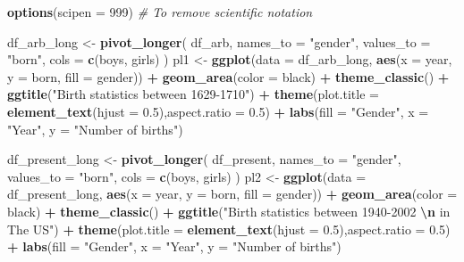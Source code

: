 \documentclass[11pt,a4paper,]{article}
\newenvironment{Shaded}{\begin{snugshade}}{\end{snugshade}}
\newcommand{\AttributeTok}[1]{\textcolor[rgb]{0.13,0.29,0.53}{#1}}
\newcommand{\CommentTok}[1]{\textcolor[rgb]{0.56,0.35,0.01}{\textit{#1}}}
\newcommand{\DecValTok}[1]{\textcolor[rgb]{0.00,0.00,0.81}{#1}}
\newcommand{\FloatTok}[1]{\textcolor[rgb]{0.00,0.00,0.81}{#1}}
\newcommand{\FunctionTok}[1]{\textcolor[rgb]{0.13,0.29,0.53}{\textbf{#1}}}
\newcommand{\NormalTok}[1]{#1}
\newcommand{\OtherTok}[1]{\textcolor[rgb]{0.56,0.35,0.01}{#1}}
\newcommand{\SpecialCharTok}[1]{\textcolor[rgb]{0.81,0.36,0.00}{\textbf{#1}}}
\newcommand{\StringTok}[1]{\textcolor[rgb]{0.31,0.60,0.02}{#1}}
\begin{document}
\begin{Shaded}
\begin{Highlighting}[]
\FunctionTok{options}\NormalTok{(}\AttributeTok{scipen =} \DecValTok{999}\NormalTok{) }\CommentTok{\# To remove scientific notation}

\NormalTok{df\_arb\_long }\OtherTok{\textless{}{-}}
  \FunctionTok{pivot\_longer}\NormalTok{(}
\NormalTok{    df\_arb,}
    \AttributeTok{names\_to =} \StringTok{"gender"}\NormalTok{,}
    \AttributeTok{values\_to =} \StringTok{"born"}\NormalTok{,}
    \AttributeTok{cols =} \FunctionTok{c}\NormalTok{(boys, girls)}
\NormalTok{  )}
\NormalTok{pl1 }\OtherTok{\textless{}{-}}
  \FunctionTok{ggplot}\NormalTok{(}\AttributeTok{data =}\NormalTok{ df\_arb\_long, }\FunctionTok{aes}\NormalTok{(}\AttributeTok{x =}\NormalTok{ year, }\AttributeTok{y =}\NormalTok{ born, }\AttributeTok{fill =}\NormalTok{ gender)) }\SpecialCharTok{+} 
  \FunctionTok{geom\_area}\NormalTok{(}\AttributeTok{color =} \StringTok{\textquotesingle{}black\textquotesingle{}}\NormalTok{) }\SpecialCharTok{+} \FunctionTok{theme\_classic}\NormalTok{() }\SpecialCharTok{+} 
  \FunctionTok{ggtitle}\NormalTok{(}\StringTok{"Birth statistics between 1629{-}1710"}\NormalTok{) }\SpecialCharTok{+} 
  \FunctionTok{theme}\NormalTok{(}\AttributeTok{plot.title =} \FunctionTok{element\_text}\NormalTok{(}\AttributeTok{hjust =} \FloatTok{0.5}\NormalTok{),}\AttributeTok{aspect.ratio =} \FloatTok{0.5}\NormalTok{) }\SpecialCharTok{+} 
  \FunctionTok{labs}\NormalTok{(}\AttributeTok{fill =} \StringTok{"Gender"}\NormalTok{, }\AttributeTok{x =} \StringTok{"Year"}\NormalTok{, }\AttributeTok{y =} \StringTok{"Number of births"}\NormalTok{)}


\NormalTok{df\_present\_long }\OtherTok{\textless{}{-}}
  \FunctionTok{pivot\_longer}\NormalTok{(}
\NormalTok{    df\_present,}
    \AttributeTok{names\_to =} \StringTok{"gender"}\NormalTok{,}
    \AttributeTok{values\_to =} \StringTok{"born"}\NormalTok{,}
    \AttributeTok{cols =} \FunctionTok{c}\NormalTok{(boys, girls)}
\NormalTok{  )}
\NormalTok{pl2 }\OtherTok{\textless{}{-}}
  \FunctionTok{ggplot}\NormalTok{(}\AttributeTok{data =}\NormalTok{ df\_present\_long, }\FunctionTok{aes}\NormalTok{(}\AttributeTok{x =}\NormalTok{ year, }\AttributeTok{y =}\NormalTok{ born, }\AttributeTok{fill =}\NormalTok{ gender)) }\SpecialCharTok{+} 
  \FunctionTok{geom\_area}\NormalTok{(}\AttributeTok{color =} \StringTok{\textquotesingle{}black\textquotesingle{}}\NormalTok{) }\SpecialCharTok{+} 
  \FunctionTok{theme\_classic}\NormalTok{() }\SpecialCharTok{+} 
  \FunctionTok{ggtitle}\NormalTok{(}\StringTok{"Birth statistics between 1940{-}2002 }\SpecialCharTok{\textbackslash{}n}\StringTok{ in The US"}\NormalTok{) }\SpecialCharTok{+} 
  \FunctionTok{theme}\NormalTok{(}\AttributeTok{plot.title =} \FunctionTok{element\_text}\NormalTok{(}\AttributeTok{hjust =} \FloatTok{0.5}\NormalTok{),}\AttributeTok{aspect.ratio =} \FloatTok{0.5}\NormalTok{) }\SpecialCharTok{+} 
  \FunctionTok{labs}\NormalTok{(}\AttributeTok{fill =} \StringTok{"Gender"}\NormalTok{, }\AttributeTok{x =} \StringTok{"Year"}\NormalTok{, }\AttributeTok{y =} \StringTok{"Number of births"}\NormalTok{)}


\end{Highlighting}
\end{Shaded}
\end{document}
